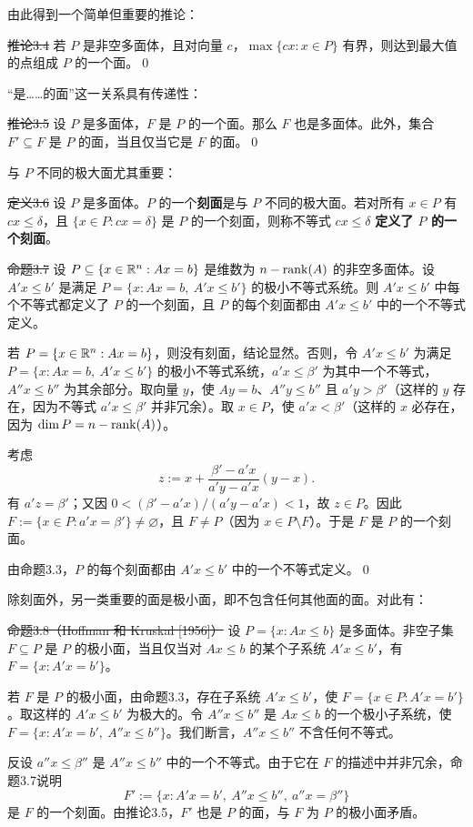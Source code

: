 由此得到一个简单但重要的推论：

\st{推论3.4} 若 $P$ 是非空多面体，且对向量 $c$，$\max\{cx:x\in P\}$ 有界，则达到最大值的点组成 $P$ 的一个面。\qed

“是……的面”这一关系具有传递性：

\st{推论3.5} 设 $P$ 是多面体，$F$ 是 $P$ 的一个面。那么 $F$ 也是多面体。此外，集合 $F'\subseteq F$ 是 $P$ 的面，当且仅当它是 $F$ 的面。\qed

与 $P$ 不同的极大面尤其重要：

\st{定义3.6} 设 $P$ 是多面体。$P$ 的一个\textbf{刻面}是与 $P$ 不同的极大面。若对所有 $x\in P$ 有 $cx\le\delta$，且 $\{x\in P:cx=\delta\}$ 是 $P$ 的一个刻面，则称不等式 $cx\le\delta$ \textbf{定义了 $P$ 的一个刻面}。

\st{命题3.7} 设 $P\subseteq\{x\in\mathbb R^n:Ax=b\}$ 是维数为 $n-\operatorname{rank}(A)$ 的非空多面体。设 $A'x\le b'$ 是满足 $P=\{x:Ax=b,\ A'x\le b'\}$ 的极小不等式系统。则 $A'x\le b'$ 中每个不等式都定义了 $P$ 的一个刻面，且 $P$ 的每个刻面都由 $A'x\le b'$ 中的一个不等式定义。

\pr 若 $P=\{x\in\mathbb R^n:Ax=b\}$，则没有刻面，结论显然。否则，令 $A'x\le b'$ 为满足 $P=\{x:Ax=b,\ A'x\le b'\}$ 的极小不等式系统，$a'x\le\beta'$ 为其中一个不等式，$A''x\le b''$ 为其余部分。取向量 $y$，使 $Ay=b$、$A''y\le b''$ 且 $a'y>\beta'$（这样的 $y$ 存在，因为不等式 $a'x\le\beta'$ 并非冗余）。取 $x\in P$，使 $a'x<\beta'$（这样的 $x$ 必存在，因为 $\dim P=n-\operatorname{rank}(A)$）。

考虑
\[
z:=x+\frac{\beta'-a'x}{a'y-a'x}(y-x).
\]
有 $a'z=\beta'$；又因 $0<(\beta'-a'x)/(a'y-a'x)<1$，故 $z\in P$。因此 $F:=\{x\in P:a'x=\beta'\}\ne\varnothing$，且 $F\ne P$（因为 $x\in P\setminus F$）。于是 $F$ 是 $P$ 的一个刻面。

由命题3.3，$P$ 的每个刻面都由 $A'x\le b'$ 中的一个不等式定义。\qed

除刻面外，另一类重要的面是极小面，即不包含任何其他面的面。对此有：

\st{命题3.8（Hoffman 和 Kruskal [1956]）} 设 $P=\{x:Ax\le b\}$ 是多面体。非空子集 $F\subseteq P$ 是 $P$ 的极小面，当且仅当对 $Ax\le b$ 的某个子系统 $A'x\le b'$，有 $F=\{x:A'x=b'\}$。

\pr 若 $F$ 是 $P$ 的极小面，由命题3.3，存在子系统 $A'x\le b'$，使 $F=\{x\in P:A'x=b'\}$。取这样的 $A'x\le b'$ 为极大的。令 $A''x\le b''$ 是 $Ax\le b$ 的一个极小子系统，使 $F=\{x:A'x=b',\ A''x\le b''\}$。我们断言，$A''x\le b''$ 不含任何不等式。

反设 $a''x\le\beta''$ 是 $A''x\le b''$ 中的一个不等式。由于它在 $F$ 的描述中并非冗余，命题3.7说明
\[
F':=\{x:A'x=b',\ A''x\le b'',\ a''x=\beta''\}
\]
是 $F$ 的一个刻面。由推论3.5，$F'$ 也是 $P$ 的面，与 $F$ 为 $P$ 的极小面矛盾。

